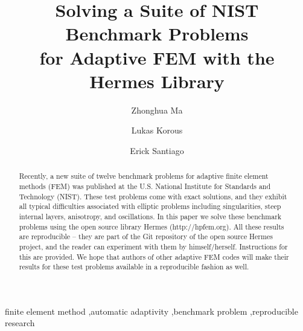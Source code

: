 \documentclass[12pt]{elsarticle}
\begin{document}
\begin{frontmatter}



\title{Solving a Suite of NIST Benchmark Problems\\ for Adaptive FEM with the Hermes Library}

\author[label1]{Zhonghua Ma}
\author[label2]{Lukas Korous}
\author[label3]{Erick Santiago}
\address[label1]{China University of Petroleum, Beijing, China}
\address[label2]{Charles University, Prague, Czech Republic}
\address[label3]{University of Nevada, Reno, USA}

\begin{abstract}
Recently, a new suite of twelve benchmark problems for adaptive finite element methods (FEM)
was published at the U.S. National Institute for Standards and Technology (NIST).
These test problems come with exact solutions, and they exhibit all typical difficulties
associated with elliptic problems including singularities, steep internal layers, anisotropy, 
and oscillations. In this paper we solve these benchmark problems using the open source 
library Hermes (http://hpfem.org). All these results are reproducible -- they are part of 
the Git repository of the open source Hermes project, and the reader can experiment
with them by himself/herself. Instructions for this are provided. We hope that authors 
of other adaptive FEM codes will make their results for these test problems available 
in a reproducible fashion as well.
\end{abstract}

\begin{keyword}
finite element method \sep automatic adaptivity \sep benchmark problem \sep reproducible research
\end{keyword}

\end{frontmatter}
\end{document}
